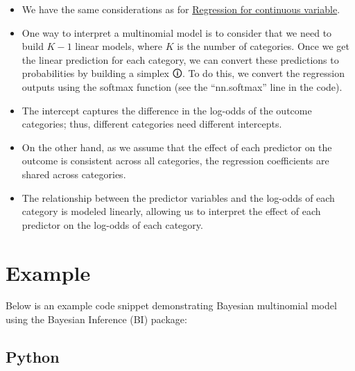 \documentclass[
  letterpaper,
  DIV=11,
  numbers=noendperiod]{scrreprt}
\begin{document}
\begin{tcolorbox}[enhanced jigsaw, toptitle=1mm, opacityback=0, titlerule=0mm, breakable, bottomrule=.15mm, colframe=quarto-callout-caution-color-frame, arc=.35mm, coltitle=black, left=2mm, opacitybacktitle=0.6, leftrule=.75mm, toprule=.15mm, rightrule=.15mm, bottomtitle=1mm, colbacktitle=quarto-callout-caution-color!10!white, title=\textcolor{quarto-callout-caution-color}{\faFire}\hspace{0.5em}{Caution}, colback=white]

\begin{itemize}
\item
  We have the same considerations as for
  \href{1.\%20Linear\%20Regression\%20for\%20continuous\%20variable.qmd}{Regression
  for continuous variable}.
\item
  One way to interpret a multinomial model is to consider that we need
  to build \(K - 1\) linear models, where \(K\) is the number of
  categories. Once we get the linear prediction for each category, we
  can convert these predictions to probabilities by building a
  \label{simplex}{{simplex 🛈}}. To do this, we convert
  the regression outputs using the softmax function (see the
  ``nn.softmax'' line in the code).
\item
  The intercept captures the difference in the log-odds of the outcome
  categories; thus, different categories need different intercepts.
\item
  On the other hand, as we assume that the effect of each predictor on
  the outcome is consistent across all categories, the regression
  coefficients are shared across categories.
\item
  The relationship between the predictor variables and the log-odds of
  each category is modeled linearly, allowing us to interpret the effect
  of each predictor on the log-odds of each category.
\end{itemize}

\end{tcolorbox}

\section{Example}\label{example-8}

Below is an example code snippet demonstrating Bayesian multinomial
model using the Bayesian Inference (BI) package:

\subsection{Python}
\end{document}
